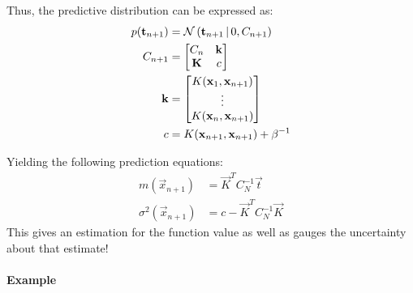 			Thus, the predictive distribution can be expressed as:
			\begin{align}
				p(\boldsymbol{\mathrm{t}}_{n + 1}) &= \mathcal{N}\,(\boldsymbol{\mathrm{t}}_{n + 1} \,\vert\, 0, C_{n + 1}) \\
				C_{n + 1} &=
					\begin{bmatrix}
						C_n & \boldsymbol{\mathrm{k}} \\
						\boldsymbol{\mathrm{K}} & c
					\end{bmatrix} \\
				\boldsymbol{\mathrm{k}} &=
					\begin{bmatrix}
						K(\boldsymbol{\mathrm{x}}_1, \boldsymbol{\mathrm{x}}_{n + 1}) \\
						\vdots \\
						K(\boldsymbol{\mathrm{x}}_n, \boldsymbol{\mathrm{x}}_{n + 1})
					\end{bmatrix} \\
				c &= K(\boldsymbol{\mathrm{x}}_{n + 1}, \boldsymbol{\mathrm{x}}_{n + 1}) + \beta^{-1}
			\end{align}
			
			Yielding the following prediction equations:
			\begin{align}
				m(\vec{x}_{n + 1}) &= \vec{K}^T C_N^{-1} \vec{t} \\
				\sigma^2(\vec{x}_{n + 1}) &= c - \vec{K}^T C_N^{-1} \vec{K}
			\end{align}
			This gives an estimation for the function value as well as gauges the uncertainty about that estimate!
			
			\paragraph{Example}

